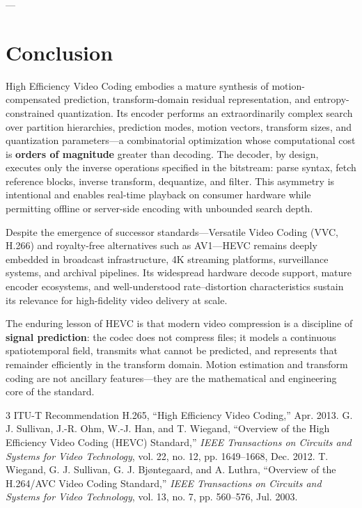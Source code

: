 \documentclass[11pt,journal,onecolumn]{IEEEtran}
\begin{document}
---

\section{Conclusion}
High Efficiency Video Coding embodies a mature synthesis of motion-compensated prediction, transform-domain residual representation, and entropy-constrained quantization. Its encoder performs an extraordinarily complex search over partition hierarchies, prediction modes, motion vectors, transform sizes, and quantization parameters---a combinatorial optimization whose computational cost is \textbf{orders of magnitude} greater than decoding. The decoder, by design, executes only the inverse operations specified in the bitstream: parse syntax, fetch reference blocks, inverse transform, dequantize, and filter. This asymmetry is intentional and enables real-time playback on consumer hardware while permitting offline or server-side encoding with unbounded search depth.

Despite the emergence of successor standards---Versatile Video Coding (VVC, H.266) and royalty-free alternatives such as AV1---HEVC remains deeply embedded in broadcast infrastructure, 4K streaming platforms, surveillance systems, and archival pipelines. Its widespread hardware decode support, mature encoder ecosystems, and well-understood rate--distortion characteristics sustain its relevance for high-fidelity video delivery at scale.

The enduring lesson of HEVC is that modern video compression is a discipline of \textbf{signal prediction}: the codec does not compress files; it models a continuous spatiotemporal field, transmits what cannot be predicted, and represents that remainder efficiently in the transform domain. Motion estimation and transform coding are not ancillary features---they are the mathematical and engineering core of the standard.

\begin{thebibliography}{3}
ITU-T Recommendation H.265, ``High Efficiency Video Coding,'' Apr. 2013.
G. J. Sullivan, J.-R. Ohm, W.-J. Han, and T. Wiegand, ``Overview of the High Efficiency Video Coding (HEVC) Standard,'' \textit{IEEE Transactions on Circuits and Systems for Video Technology}, vol. 22, no. 12, pp. 1649--1668, Dec. 2012.
T. Wiegand, G. J. Sullivan, G. J. Bj{\o}ntegaard, and A. Luthra, ``Overview of the H.264/AVC Video Coding Standard,'' \textit{IEEE Transactions on Circuits and Systems for Video Technology}, vol. 13, no. 7, pp. 560--576, Jul. 2003.
\end{thebibliography}
\end{document}
